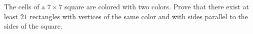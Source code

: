 The cells of a $7 \times 7$ square are colored with two colors. Prove that there exist at least $21$ rectangles with vertices of the same color and with sides parallel to the sides of the square.
